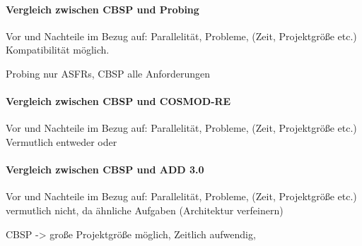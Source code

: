 \paragraph{Vergleich zwischen CBSP und Probing}
Vor und Nachteile im Bezug auf: Parallelität, Probleme, (Zeit, Projektgröße etc.)\\

Kompatibilität möglich.

Probing nur ASFRs, CBSP alle Anforderungen \\

\paragraph{Vergleich zwischen CBSP und COSMOD-RE}
Vor und Nachteile im Bezug auf: Parallelität, Probleme, (Zeit, Projektgröße etc.)\\

Vermutlich entweder oder \\

\paragraph{Vergleich zwischen CBSP und ADD 3.0}
Vor und Nachteile im Bezug auf: Parallelität, Probleme, (Zeit, Projektgröße etc.)\\

vermutlich nicht, da ähnliche Aufgaben (Architektur verfeinern) 

CBSP -> große Projektgröße möglich, Zeitlich aufwendig, \\